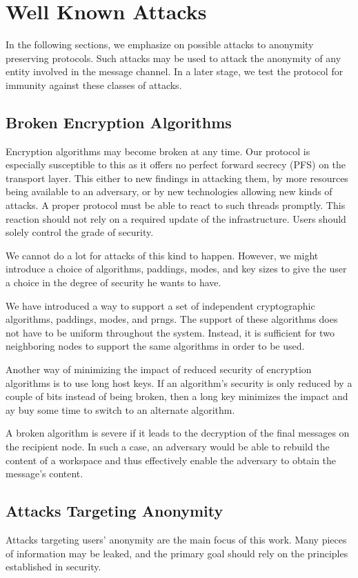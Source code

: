 \section{Well Known Attacks}\label{sec:wellKnownAttacks}
In the following sections, we emphasize on possible attacks to anonymity preserving protocols. Such attacks may be used to attack the anonymity of any entity involved in the message channel. In a later stage, we test the protocol for immunity against these classes of attacks.

\subsection{Broken Encryption Algorithms}
Encryption algorithms may become broken at any time. Our protocol is especially susceptible to this as it offers no perfect forward secrecy (PFS) on the transport layer. This either to new findings in attacking them, by more resources being available to an adversary, or by new technologies allowing new kinds of attacks. A proper protocol must be able to react to such threads promptly. This reaction should not rely on a required update of the infrastructure. Users should solely control the grade of security. 

We cannot do a lot for attacks of this kind to happen. However, we might introduce a choice of algorithms, paddings, modes, and key sizes to give the user a choice in the degree of security he wants to have.

We have introduced a way to support a set of independent cryptographic algorithms, paddings, modes, and prngs. The support of these algorithms does not have to be uniform throughout the system. Instead, it is sufficient for two neighboring nodes to support the same algorithms in order to be used. 

Another way of minimizing the impact of reduced security of encryption algorithms is to use long host keys. If an algorithm's security is only reduced by a couple of bits instead of being broken, then a long key minimizes the impact and ay buy some time to switch to an alternate algorithm. 

A broken algorithm is severe if it leads to the decryption of the final messages on the recipient node. In such a case, an adversary would be able to rebuild the content of a workspace and thus effectively enable the adversary to obtain the message's content.

\subsection{Attacks Targeting Anonymity}
Attacks targeting users' anonymity are the main focus of this work. Many pieces of information may be leaked, and the primary goal should rely on the principles established in security.

